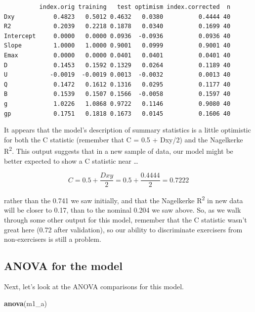 \documentclass[]{book}
\newenvironment{Shaded}{\begin{snugshade}}{\end{snugshade}}
\newcommand{\KeywordTok}[1]{\textcolor[rgb]{0.13,0.29,0.53}{\textbf{#1}}}
\newcommand{\NormalTok}[1]{#1}
\theoremstyle{definition}
\theoremstyle{definition}
\theoremstyle{definition}
\theoremstyle{remark}
\begin{document}
\begin{verbatim}
          index.orig training   test optimism index.corrected  n
Dxy           0.4823   0.5012 0.4632   0.0380          0.4444 40
R2            0.2039   0.2218 0.1878   0.0340          0.1699 40
Intercept     0.0000   0.0000 0.0936  -0.0936          0.0936 40
Slope         1.0000   1.0000 0.9001   0.0999          0.9001 40
Emax          0.0000   0.0000 0.0401   0.0401          0.0401 40
D             0.1453   0.1592 0.1329   0.0264          0.1189 40
U            -0.0019  -0.0019 0.0013  -0.0032          0.0013 40
Q             0.1472   0.1612 0.1316   0.0295          0.1177 40
B             0.1539   0.1507 0.1566  -0.0058          0.1597 40
g             1.0226   1.0868 0.9722   0.1146          0.9080 40
gp            0.1751   0.1818 0.1673   0.0145          0.1606 40
\end{verbatim}

It appears that the model's description of summary statistics is a
little optimistic for both the C statistic (remember that C = 0.5 +
Dxy/2) and the Nagelkerke R\textsuperscript{2}. This output suggests
that in a new sample of data, our model might be better expected to show
a C statistic near \ldots{}

\[ 
C = 0.5 + \frac{Dxy}{2} = 0.5 + \frac{0.4444}{2} = 0.7222
\]

rather than the 0.741 we saw initially, and that the Nagelkerke
R\textsuperscript{2} in new data will be closer to 0.17, than to the
nominal 0.204 we saw above. So, as we walk through some other output for
this model, remember that the C statistic wasn't great here (0.72 after
validation), so our ability to discriminate exercisers from
non-exercisers is still a problem.

\subsection{ANOVA for the model}\label{anova-for-the-model}

Next, let's look at the ANOVA comparisons for this model.

\begin{Shaded}
\begin{Highlighting}[]
\KeywordTok{anova}\NormalTok{(m1_a)}
\end{Highlighting}
\end{Shaded}
\end{document}
